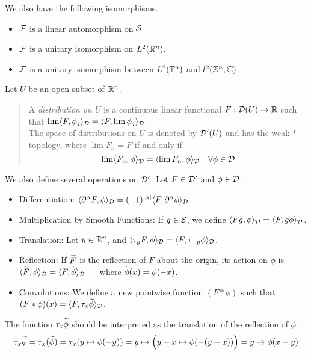 \documentclass[../main-v2-manifolds.tex]{subfiles}
\begin{document}
We also have the following isomorphisms.
\begin{itemize}
    \item $\mathcal{F}$ is a linear automorphism on $\mathcal{S}$
    \item $\mathcal{F}$ is a unitary isomorphism on $L^2({\mathbb{R}^n})$.
    \item $\mathcal{F}$ is a unitary isomorphism between $L^2(\mathbb{T}^n)$ and $l^2(\mathbb{Z}^n,{\mathbb{C}})$.
\end{itemize}
Let $U$ be an open subset of ${\mathbb{R}^n}$. 
\begin{quote}
    A \emph{distribution on $U$} is a continuous linear functional $F:\mathcal{D}(U)\to\mathbb{R}$ such that $\lim \langle F,\phi_j\rangle_{\mathcal{D}} = \langle F,\lim \phi_j\rangle_{\mathcal{D}}$.\\
    
    The space of distributions on $U$ is denoted by $\mathcal{D}'(U)$ and has the weak-$\ast$ topology, where $\lim F_n=F$ if and only if
    \[
        \lim\langle F_n,\phi\rangle_{\mathcal{D}}=\langle \lim F_n,\phi\rangle_{\mathcal{D}}\quad\forall \phi\in\mathcal{D}
    \]
\end{quote}
We also define several operations on $\mathcal{D}'$. Let $F\in\mathcal{D}'$ and $\phi\in\mathcal{D}$.
\begin{itemize}
    \item Differentiation: $\langle \partial^\alpha F,\phi\rangle_{\mathcal{D}} = (-1)^{\vert {\alpha} \vert}\langle F,\partial^\alpha\phi\rangle_{\mathcal{D}}$
    \item Multiplication by Smooth Functions: If $g\in \mathcal{E}$, we define $\langle Fg,\phi\rangle_{\mathcal{D}} = \langle F,g\phi\rangle_{\mathcal{D}}$.
    \item Translation: Let $y\in{\mathbb{R}^n}$, and $\langle \tau_y 
    F,\phi\rangle_{\mathcal{D}} = \langle F,\tau_{-y}\phi\rangle_{\mathcal{D}}$.
    \item Reflection: If $\widetilde{F}$ is the reflection of $F$ about the origin, its action on $\phi$ is $\langle \widetilde{F},\phi\rangle_{\mathcal{D}} = \langle F,\widetilde{\phi}\rangle_{\mathcal{D}}$ --- where $\widetilde{\phi}(x) = \phi(-x)$.
    \item Convolutions: We define a new pointwise function $(F\ast \phi)$ such that $(F\ast\phi)(x) = \langle F,\tau_x\widetilde{\phi}\rangle_{\mathcal{D}}$. 
\end{itemize}
\begin{remark}
    The function $\tau_x\widetilde{\phi}$ should be interpreted as the translation of the reflection of $\phi$. 
    \[
        \tau_x\widetilde{\phi} = \tau_x(\widetilde{\phi}) = \tau_x(y\mapsto \phi(-y)) = y\mapsto \qty\Big(y-x\mapsto \phi(-(y-x))) = y\mapsto \phi(x-y)
    \]
\end{remark}
\end{document}
